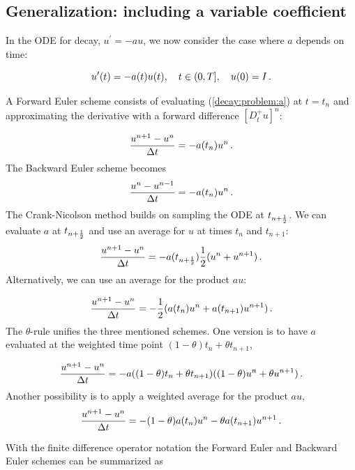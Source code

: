 \documentclass[%
oneside,                 %
final,                   %
10pt]{article}
\begin{document}
\subsection{Generalization: including a variable coefficient}

In the ODE for decay, $u^{\prime}=-au$, we now consider the case where $a$
depends on time:

\begin{equation}
u^{\prime}(t) = -a(t)u(t),\quad t\in (0,T],\quad u(0)=I \thinspace .
\label{decay:problem:a}
\end{equation}

A Forward Euler scheme consists of evaluating (\ref{decay:problem:a})
at $t=t_n$ and approximating the derivative with a forward
difference $[D^+_t u]^n$:

\begin{equation}
\frac{u^{n+1} - u^n}{\Delta t} = -a(t_n)u^n
\thinspace .
\end{equation}
The Backward Euler scheme becomes
\begin{equation}
\frac{u^{n} - u^{n-1}}{\Delta t} = -a(t_n)u^n
\thinspace .
\end{equation}
The Crank-Nicolson method builds on sampling the ODE at
$t_{n+\frac{1}{2}}$. We can evaluate $a$ at $t_{n+\frac{1}{2}}$
and use an average for $u$ at
times $t_n$ and $t_{n+1}$:
\begin{equation}
\frac{u^{n+1} - u^{n}}{\Delta t} = -a(t_{n+\frac{1}{2}})\frac{1}{2}(u^n + u^{n+1})
\thinspace .
\end{equation}
Alternatively, we can use an average for the product $au$:

\begin{equation}
\frac{u^{n+1} - u^{n}}{\Delta t} = -\frac{1}{2}(a(t_n)u^n + a(t_{n+1})u^{n+1})
\thinspace .
\end{equation}
The $\theta$-rule unifies the three mentioned schemes. One version is to
have $a$ evaluated at the weighted time point $(1-\theta)t_n + \theta t_{n+1}$,

\begin{equation}
\frac{u^{n+1} - u^{n}}{\Delta t} = -a((1-\theta)t_n + \theta t_{n+1})((1-\theta) u^n + \theta u^{n+1})
\thinspace .
\end{equation}
Another possibility is to apply a weighted average for the product $au$,
\begin{equation}
\frac{u^{n+1} - u^{n}}{\Delta t} = -(1-\theta) a(t_n)u^n - \theta
a(t_{n+1})u^{n+1}
\thinspace .
\end{equation}

With the finite difference operator notation the Forward Euler and Backward
Euler schemes can be summarized as
\end{document}
